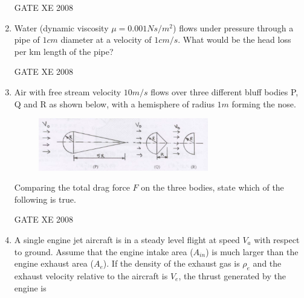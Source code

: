 \documentclass[12pt]{article}
\begin{document}
\begin{enumerate}
GATE XE 2008
\item Water (dynamic viscosity $\mu = 0.001 Ns/m^2$) flows under pressure through a pipe of $1 cm$ diameter at a velocity of $1 cm/s$. What would be the head loss per km length of the pipe?

\begin{enumerate}
\end{enumerate}

GATE XE 2008
\item  Air with free stream velocity $10 m/s$ flows over three different bluff bodies P, Q and R as shown below, with a hemisphere of radius $1 m$ forming the nose.

\begin{figure}[H]
\centering
  \includegraphics[width=0.7\textwidth]{figs/ass1_d_q21.png}
  \caption{}
\end{figure} 

Comparing the total drag force $F$ on the three bodies, state which of the following is true.

\begin{enumerate}
\end{enumerate}

GATE XE 2008
\item A single engine jet aircraft is in a steady level flight at speed $V_a$ with respect to ground. Assume that the engine intake area ($A_{in}$) is much larger than the engine exhaust area ($A_e$). If the density of the exhaust gas is $\rho _e$ and the exhaust velocity relative to the aircraft is $V_e$, the thrust generated by
the engine is


\end{enumerate}
\end{document}
